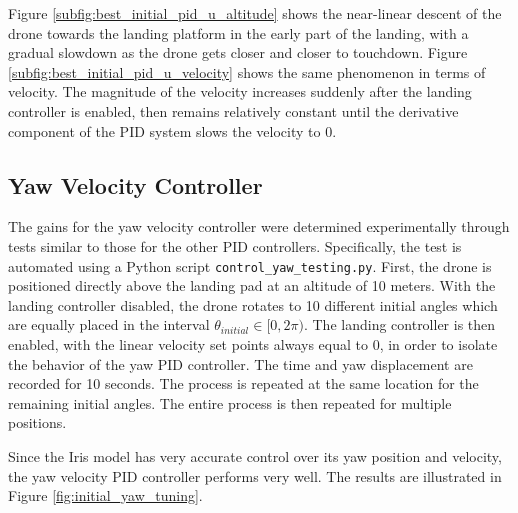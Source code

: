 Figure \ref{subfig:best_initial_pid_u_altitude} shows the near-linear descent of the drone towards the landing platform in the early part of the landing, with a gradual slowdown as the drone gets closer and closer to touchdown. Figure \ref{subfig:best_initial_pid_u_velocity} shows the same phenomenon in terms of velocity. The magnitude of the velocity increases suddenly after the landing controller is enabled, then remains relatively constant until the derivative component of the PID system slows the velocity to 0.

\subsection{Yaw Velocity Controller}

The gains for the yaw velocity controller were determined experimentally through tests similar to those for the other PID controllers. Specifically, the test is automated using a Python script \texttt{control\_yaw\_testing.py}. First, the drone is positioned directly above the landing pad at an altitude of 10 meters. With the landing controller disabled, the drone rotates to 10 different initial angles which are equally placed in the interval $\theta_{initial} \in [0, 2\pi)$. The landing controller is then enabled, with the linear velocity set points always equal to 0, in order to isolate the behavior of the yaw PID controller. The time and yaw displacement are recorded for 10 seconds. The process is repeated at the same location for the remaining initial angles. The entire process is then repeated for multiple positions.

Since the Iris model has very accurate control over its yaw position and velocity, the yaw velocity PID controller performs very well. The results are illustrated in Figure \ref{fig:initial_yaw_tuning}.

